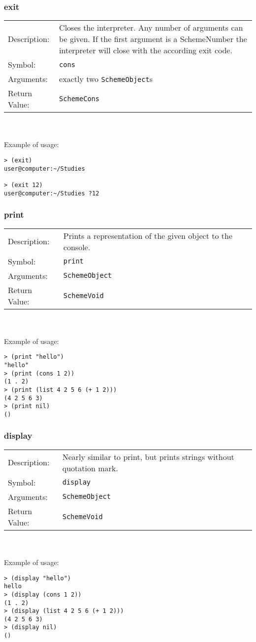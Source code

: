 \documentclass[12pt,a4paper]{scrartcl}
\begin{document}
\subsubsection*{exit}
\begin{tabular}{l  p{13cm}}
Description: & Closes the interpreter. Any number of arguments can be given. If the first argument is a SchemeNumber the interpreter will close with the according exit code.\\
Symbol: & \lstinline{cons}\\
Arguments: & exactly two \lstinline{SchemeObject}s\\
Return Value: & \lstinline{SchemeCons}
\end{tabular}
\\
\\
Example of usage:
\begin{lstlisting}
> (exit)
user@computer:~/Studies        

> (exit 12)
user@computer:~/Studies ?12        
\end{lstlisting}

\subsubsection*{print}
\begin{tabular}{l  p{13cm}}
Description: & Prints a representation of the given object to the console.\\
Symbol: & \lstinline{print}\\
Arguments: & \lstinline{SchemeObject}\\
Return Value: & \lstinline{SchemeVoid}
\end{tabular}
\\
\\
Example of usage:
\begin{lstlisting}
> (print "hello")
"hello"
> (print (cons 1 2))
(1 . 2)
> (print (list 4 2 5 6 (+ 1 2)))
(4 2 5 6 3)
> (print nil)
()
\end{lstlisting}

\subsubsection*{display}
\begin{tabular}{l  p{13cm}}
Description: & Nearly similar to print, but prints strings without quotation mark.\\
Symbol: & \lstinline{display}\\
Arguments: & \lstinline{SchemeObject}\\
Return Value: & \lstinline{SchemeVoid}
\end{tabular}
\\
\\
Example of usage:
\begin{lstlisting}
> (display "hello")
hello
> (display (cons 1 2))
(1 . 2)
> (display (list 4 2 5 6 (+ 1 2)))
(4 2 5 6 3)
> (display nil)
()
\end{lstlisting}
\end{document}
